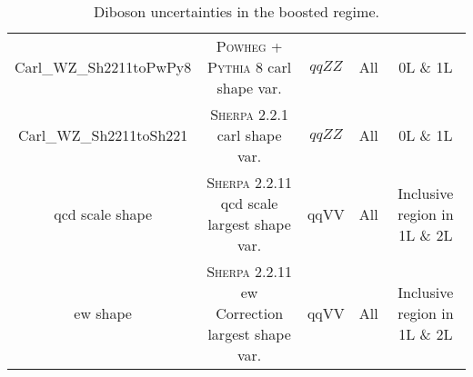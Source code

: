 \begin{table}[h!]
{\begin{tabular}{ c | c | c | c | c }
     Carl\_WZ\_Sh2211toPwPy8 & \textsc{Powheg} + \textsc{Pythia} 8 \gls{carl} shape var. & $qqZZ$ & All & 0L \& 1L \\
     Carl\_WZ\_Sh2211toSh221 & \textsc{Sherpa} 2.2.1 \gls{carl} shape var. & $qqZZ$ & All & 0L \& 1L \\
     \gls{qcd} scale shape & \textsc{Sherpa} 2.2.11 \gls{qcd} scale largest shape var. & qqVV & All & Inclusive region in 1L \& 2L \\
     \gls{ew} shape & \textsc{Sherpa} 2.2.11 \gls{ew} Correction largest shape var. & qqVV & All & Inclusive region in 1L \& 2L \\
     \hline \hline
     \end{tabular}
    }
    \caption{Diboson uncertainties in the boosted regime.} 
     \label{table:VV_SysBoos_Summary}
\end{table}